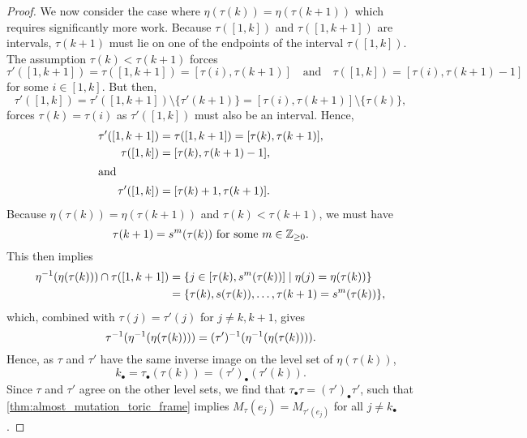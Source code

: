 \begin{proof}
	We now consider the case where $\eta(\tau(k)) = \eta(\tau(k+1))$ which requires
	significantly more work. Because $\tau([1, k])$ and $\tau([1, k+1])$ are intervals,
	$\tau(k+1)$ must lie on one of the endpoints of the interval $\tau([1, k])$. The
	assumption $\tau(k) < \tau(k+1)$ forces
	\begin{equation*}
		\tau'([1, k+1]) = \tau([1, k+1]) = [\tau(i), \tau(k+1)] \quad \text{and}\quad \tau([1, k]) = [\tau(i), \tau(k+1) - 1]
	\end{equation*}
	for some $i\in [1, k]$. But then,
	\begin{equation*}
		\tau'([1, k]) = \tau'([1, k+1])\setminus\{\tau'(k+1)\} = [\tau(i), \tau(k+1)] \setminus \{\tau(k)\},
	\end{equation*}
	forces $\tau(k) = \tau(i)$ as $\tau'([1, k])$ must also be an interval. Hence,
	\begin{align*}
		\tau'([1, k+1]) & = \tau([1, k+1]) = [\tau(k), \tau(k+1)], \\
		\tau([1, k])    & = [\tau(k), \tau(k+1) - 1],              \\
		\shortintertext{and}
		\tau'([1, k])   & = [\tau(k) + 1, \tau(k+1)].
	\end{align*}
	Because $\eta(\tau(k)) = \eta(\tau(k+1))$ and $\tau(k) < \tau(k+1)$, we must have
	\begin{equation*}
		\tau(k+1) = s^m(\tau(k)) \text{ for some } m \in \mathbb{Z}_{\geq 0}.
	\end{equation*}
	This then implies
	\begin{equation}\label{eq:level_set_tau_k}
		\begin{aligned}
			\eta^{-1}(\eta(\tau(k))) \cap \tau([1, k+1])
			 & = \{j \in [\tau(k), s^m(\tau(k))] \mid \eta(j) = \eta(\tau(k))\} \\
			 & = \{\tau(k), s(\tau(k)), \dots, \tau(k+1) = s^m(\tau(k))\},
		\end{aligned}
	\end{equation}
	which, combined with $\tau(j) = \tau'(j)$ for $j\neq k, k+1$, gives
	\begin{equation*}
		\tau^{-1}(\eta^{-1}(\eta(\tau(k)))) = (\tau')^{-1}(\eta^{-1}(\eta(\tau(k)))).
	\end{equation*}
	Hence, as $\tau$ and $\tau'$ have the same inverse image on the level set of
	$\eta(\tau(k))$,
	\begin{equation*}
		k_\bullet = \tau_\bullet(\tau(k)) = (\tau')_\bullet(\tau'(k)).
	\end{equation*}
	Since $\tau$ and $\tau'$ agree on the other level sets, we find that $\tau_\bullet \tau
		= (\tau')_\bullet \tau'$, such that \cref{thm:almost_mutation_toric_frame} implies
	$M_\tau(e_j) = M_{\tau'(e_j)}$ for all $j \neq k_\bullet$.


\end{proof}
